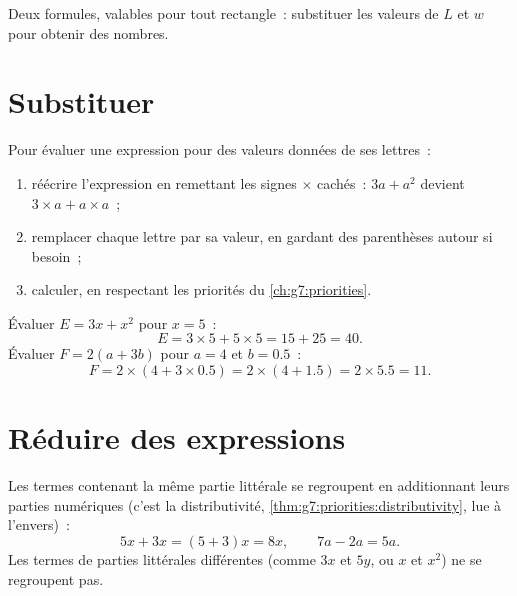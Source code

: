 \begin{omfigure}

{\small Deux formules, valables pour tout rectangle~: substituer les
valeurs de $L$ et $w$ pour obtenir des nombres.}
\end{omfigure}

\section{Substituer}

\begin{method}\label{met:g7:literal:substitute}
Pour évaluer une expression pour des valeurs données de ses
lettres~:
\begin{enumerate}
  \item réécrire l'expression en remettant les signes $\times$
        cachés~: $3a + a^2$ devient $3 \times a + a \times a$~;
  \item remplacer chaque lettre par sa valeur, en gardant des
        parenthèses autour si besoin~;
  \item calculer, en respectant les priorités du
        \cref{ch:g7:priorities}.
\end{enumerate}
\end{method}

\begin{example}\label{ex:g7:literal:substitute}
Évaluer $E = 3x + x^2$ pour $x = 5$~:
\[
E = 3 \times 5 + 5 \times 5 = 15 + 25 = 40 .
\]
Évaluer $F = 2(a + 3b)$ pour $a = 4$ et $b = 0.5$~:
\[
F = 2 \times (4 + 3 \times 0.5) = 2 \times (4 + 1.5) = 2 \times 5.5
= 11 .
\]
\end{example}

\section{Réduire des expressions}

\begin{proposition}\label{prop:g7:literal:reduce}
Les termes contenant la même partie littérale se regroupent en
additionnant leurs parties numériques (c'est la distributivité,
\cref{thm:g7:priorities:distributivity}, lue à l'envers)~:
\[
5x + 3x = (5 + 3)x = 8x,
\qquad
7a - 2a = 5a .
\]
Les termes de parties littérales différentes (comme $3x$ et $5y$,
ou $x$ et $x^2$) ne se regroupent pas.
\end{proposition}

